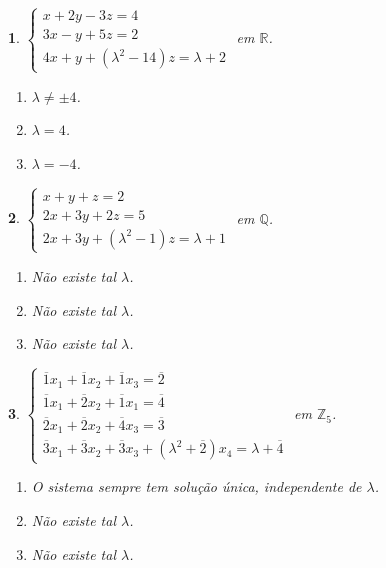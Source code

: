 \documentclass[12pt]{exam}
\newtheorem{exercicio}{}
\newcommand{\integer}{\mathbb{Z}}
\newcommand{\rac}{\mathbb{Q}}
\newcommand{\real}{\mathbb{R}}
\begin{document}
\begin{exercicio}
$\begin{cases}
  x + 2y - 3z = 4\\
  3x - y + 5z = 2\\
  4x + y + (\lambda^2 - 14)z = \lambda + 2
\end{cases}$ em $\real$.
\begin{solucao}
  \begin{enumerate}[label={\alph*})]
    \item $\lambda \ne \pm 4$.
    \item $\lambda = 4$.
    \item $\lambda = -4$.
  \end{enumerate}
\end{solucao}
\end{exercicio}

\begin{exercicio}
$\begin{cases}
  x + y + z = 2\\
  2x + 3y + 2z = 5\\
  2x + 3y + (\lambda^2 - 1)z = \lambda + 1
\end{cases}$ em $\rac$.
\begin{solucao}
  \begin{enumerate}[label={\alph*})]
    \item N\~ao existe tal $\lambda$.
    \item N\~ao existe tal $\lambda$.
    \item N\~ao existe tal $\lambda$.
  \end{enumerate}
\end{solucao}
\end{exercicio}

\begin{exercicio}
$\begin{cases}
  \overline{1}x_1 + \overline{1}x_2 + \overline{1}x_3= \overline{2}\\
  \overline{1}x_1 + \overline{2}x_2 + \overline{1}x_1 = \overline{4}\\
  \overline{2}x_1 + \overline{2}x_2 + \overline{4}x_3 = \overline{3}\\
  \overline{3}x_1 + \overline{3}x_2 + \overline{3}x_3 + (\lambda^2 + \overline{2})x_4 = \lambda + \overline{4}
\end{cases}$ em $\integer_5$.
\begin{solucao}
  \begin{enumerate}[label={\alph*})]
    \item O sistema sempre tem solu\c{c}\~ao \'unica, independente de $\lambda$.
    \item N\~ao existe tal $\lambda$.
    \item N\~ao existe tal $\lambda$.
  \end{enumerate}
\end{solucao}
\end{exercicio}
\end{document}
